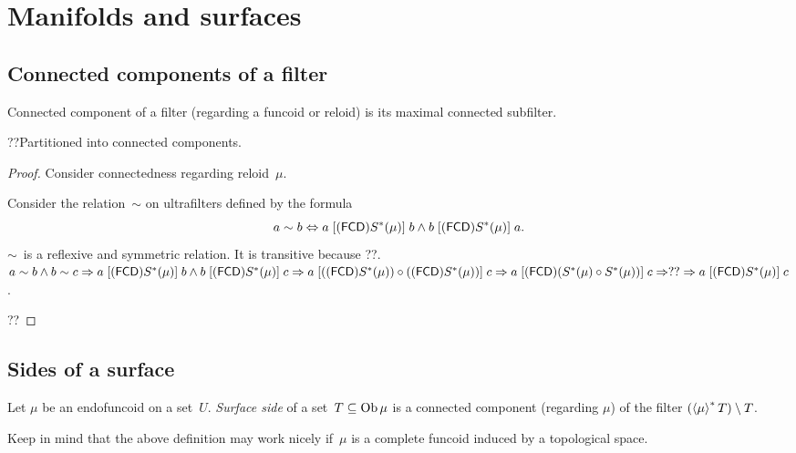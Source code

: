 \chapter{Manifolds and surfaces}

\section{Connected components of a filter}

\begin{defn}
Connected component of a filter (regarding a funcoid or reloid)
is its maximal connected subfilter.
\end{defn}

\begin{thm}
??Partitioned into connected components.
\end{thm}

\begin{proof}

Consider connectedness regarding reloid~$\mu$.

Consider the relation~$\sim$ on ultrafilters defined by the formula
\[ a\sim b\Leftrightarrow a\mathrel{\left[(\mathsf{FCD}) S^\ast(\mu)\right]}b \land
b\mathrel{\left[(\mathsf{FCD}) S^\ast(\mu)\right]}a. \]
$\sim$~is a reflexive and symmetric relation.
It is transitive because ??.
$a\sim b\land b\sim c \Rightarrow
a\mathrel{\left[(\mathsf{FCD}) S^\ast(\mu)\right]}b \land b\mathrel{\left[(\mathsf{FCD}) S^\ast(\mu)\right]}c
\Rightarrow
a\mathrel{\left[((\mathsf{FCD}) S^\ast(\mu))\circ((\mathsf{FCD}) S^\ast(\mu))\right]}c
\Rightarrow
a\mathrel{\left[(\mathsf{FCD})(S^\ast(\mu)\circ S^\ast(\mu))\right]}c
\Rightarrow??\Rightarrow
a\mathrel{\left[(\mathsf{FCD}) S^\ast(\mu)\right]}c$.

??
\end{proof}

\section{Sides of a surface}

\begin{defn}
Let $\mu$ be an endofuncoid on a set~$U$.
\emph{Surface side} of a set~$T\subseteq\operatorname{Ob}\mu$ is a connected component
(regarding $\mu$) of the filter $(\left\langle \mu\right\rangle ^{\ast}T)\setminus T$.
\end{defn}

Keep in mind that the above definition may work nicely if~$\mu$ is
a complete funcoid induced by a topological space.

